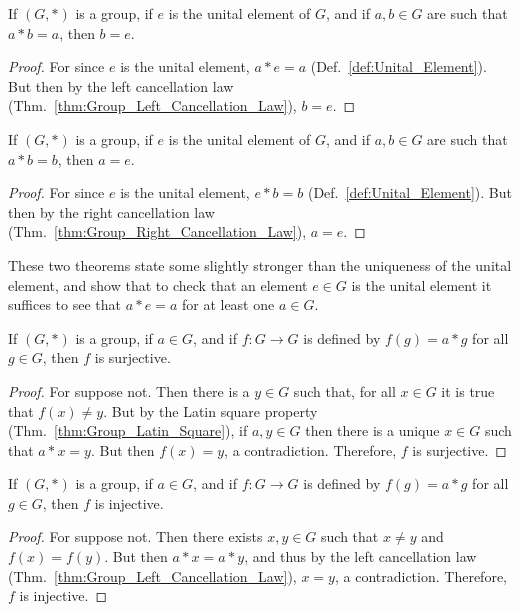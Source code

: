     \begin{theorem}
        If $(G,*)$ is a group, if $e$ is the unital element of $G$, and if
        $a,b\in{G}$ are such that $a*b=a$, then $b=e$.
    \end{theorem}
    \begin{proof}
        For since $e$ is the unital element, $a*e=a$
        (Def.~\ref{def:Unital_Element}). But then by the left cancellation
        law (Thm.~\ref{thm:Group_Left_Cancellation_Law}), $b=e$.
    \end{proof}
    \begin{theorem}
        If $(G,*)$ is a group, if $e$ is the unital element of $G$, and if
        $a,b\in{G}$ are such that $a*b=b$, then $a=e$.
    \end{theorem}
    \begin{proof}
        For since $e$ is the unital element, $e*b=b$
        (Def.~\ref{def:Unital_Element}). But then by the right cancellation
        law (Thm.~\ref{thm:Group_Right_Cancellation_Law}), $a=e$.
    \end{proof}
    These two theorems state some slightly stronger than the uniqueness of
    the unital element, and show that to check that an element $e\in{G}$ is the
    unital element it suffices to see that $a*e=a$ for at least one $a\in{G}$.
    \begin{theorem}
        \label{thm:Group_Mult_by_Const_is_Surj_Func}%
        If $(G,*)$ is a group, if $a\in{G}$, and if $f:G\rightarrow{G}$ is
        defined by $f(g)=a*g$ for all $g\in{G}$, then $f$ is surjective.
    \end{theorem}
    \begin{proof}
        For suppose not. Then there is a $y\in{G}$ such that, for all $x\in{G}$
        it is true that $f(x)\ne{y}$. But by the Latin square property
        (Thm.~\ref{thm:Group_Latin_Square}), if $a,y\in{G}$ then there is a
        unique $x\in{G}$ such that $a*x=y$. But then $f(x)=y$, a contradiction.
        Therefore, $f$ is surjective.
    \end{proof}
    \begin{theorem}
        \label{thm:Group_Mult_by_Const_is_Inj_Func}%
        If $(G,*)$ is a group, if $a\in{G}$, and if $f:G\rightarrow{G}$ is
        defined by $f(g)=a*g$ for all $g\in{G}$, then $f$ is injective.
    \end{theorem}
    \begin{proof}
        For suppose not. Then there exists $x,y\in{G}$ such that $x\ne{y}$ and
        $f(x)=f(y)$. But then $a*x=a*y$, and thus by the left cancellation law
        (Thm.~\ref{thm:Group_Left_Cancellation_Law}), $x=y$, a contradiction.
        Therefore, $f$ is injective.
    \end{proof}
